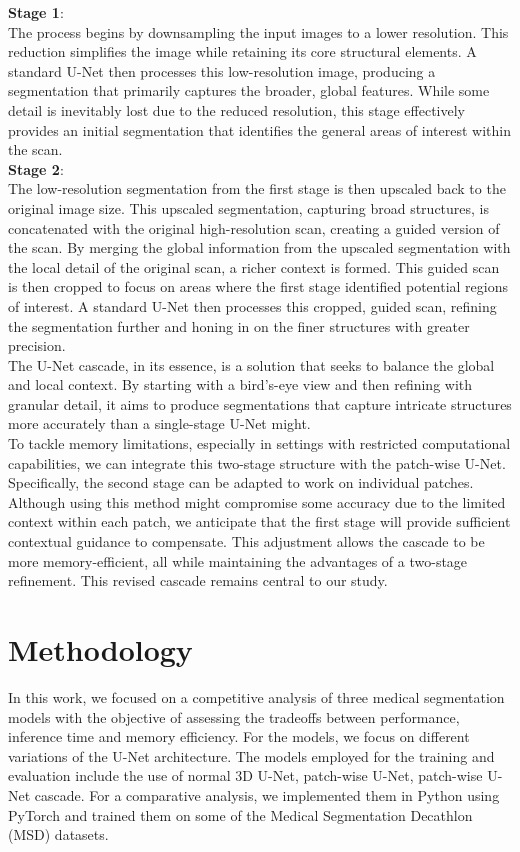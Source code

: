 \noindent\textbf{Stage 1}:\\
The process begins by downsampling the input images to a lower resolution. This reduction simplifies the image while retaining its core structural elements.
A standard U-Net then processes this low-resolution image, producing a segmentation that primarily captures the broader, global features.
While some detail is inevitably lost due to the reduced resolution,
this stage effectively provides an initial segmentation that identifies the general areas of interest within the scan.\\[1ex]
\noindent\textbf{Stage 2}:\\
The low-resolution segmentation from the first stage is then upscaled back to the original image size. This upscaled segmentation, capturing broad structures,
is concatenated with the original high-resolution scan, creating a guided version of the scan.
By merging the global information from the upscaled segmentation with the local detail of the original scan, a richer context is formed.
This guided scan is then cropped to focus on areas where the first stage identified potential regions of interest.
A standard U-Net then processes this cropped, guided scan, refining the segmentation further and honing in on the finer structures with greater precision.\\[1ex]
The U-Net cascade, in its essence, is a solution that seeks to balance the global and local context.
By starting with a bird's-eye view and then refining with granular detail, it aims to produce segmentations that capture intricate structures more accurately than a single-stage U-Net might.\\[1ex]
To tackle memory limitations, especially in settings with restricted computational capabilities, we can integrate this two-stage structure with the patch-wise U-Net.
Specifically, the second stage can be adapted to work on individual patches.
Although using this method might compromise some accuracy due to the limited context within each patch,
we anticipate that the first stage will provide sufficient contextual guidance to compensate. This adjustment allows the cascade to be more memory-efficient,
all while maintaining the advantages of a two-stage refinement. This revised cascade remains central to our study.

\chapter{Methodology}
In this work, we focused on a competitive analysis of three medical segmentation models with the objective of assessing the tradeoffs between performance, inference time and memory efficiency.
For the models, we focus on different variations of the U-Net architecture. The models employed for the training and evaluation include the use of normal $3$D U-Net, patch-wise U-Net,
patch-wise U-Net cascade. For a comparative analysis, we implemented them in Python using PyTorch and trained them on some of the Medical Segmentation Decathlon (MSD) datasets.\\

